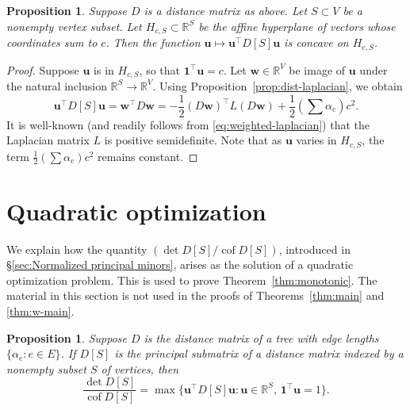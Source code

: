 \documentclass[12pt]{amsart}
\newtheorem{prop}[thm]{Proposition}
\theoremstyle{definition}
\newcommand{\RR}{\mathbb{R}}
\newcommand{\bone}{\mathbf{1}}
\newcommand{\boldu}{\mathbf{u}}
\newcommand{\boldw}{\mathbf{w}}
\newcommand{\tr}{\intercal}
\DeclareMathOperator{\cof}{cof}
\begin{document}
\begin{prop}
\label{prop:negdef-hyperplane}
Suppose $D$ is a distance matrix as above. %
Let $S \subset V$ be a nonempty vertex subset.
Let $H_{c, S} \subset \RR^S$ be the affine hyperplane of vectors whose coordinates sum to $c$.
Then the function $\boldu \mapsto \boldu^\tr D[S] \boldu$ is concave on $H_{c, S}$.
\end{prop}
\begin{proof}
Suppose $\boldu$ is in $H_{c, S}$, so that $\bone^\tr \boldu = c$.
Let $\boldw \in \RR^V$ be image of $\boldu$ under the natural inclusion $\RR^S \to \RR^V$.
Using Proposition~\ref{prop:dist-laplacian}, we obtain
\[
	\boldu^\tr D[S]\boldu = \boldw^\tr D \boldw = - \frac12 (D \boldw)^\tr L (D \boldw) + \frac12 \left(\sum \alpha_e\right) c^2.
\]
It is well-known (and readily follows from \eqref{eq:weighted-laplacian}) that the Laplacian matrix $L$ is positive semidefinite. Note that as $\boldu$ varies in $H_{c, S}$, the term $\frac12 \left(\sum \alpha_e\right) c^2$ remains constant.
\end{proof}


\section{Quadratic optimization}
\label{sec:optimization}

We explain how the quantity $({\det D[S]}/{\cof D[S]})$, introduced in \S\ref{sec:Normalized principal minors}, arises as the solution of a quadratic optimization problem.
This is used to prove Theorem~\ref{thm:monotonic}.
The material in this section is not used in the proofs of Theorems~\ref{thm:main} and \ref{thm:w-main}.

\begin{prop}
\label{prop:optimization}
Suppose $D$ is the distance matrix of a tree with edge lengths $\{\alpha_e \colon e \in E\}$. 
If $D[S]$ is the principal submatrix of a distance matrix indexed by a nonempty subset $S$ of vertices, then
\[
	\frac{\det D[S]}{\cof D[S]} = \max \{\boldu^\tr D[S] \boldu \colon \boldu \in \RR^S,\, \bone^\tr \boldu = 1 \}.
\]
\end{prop}
\end{document}
